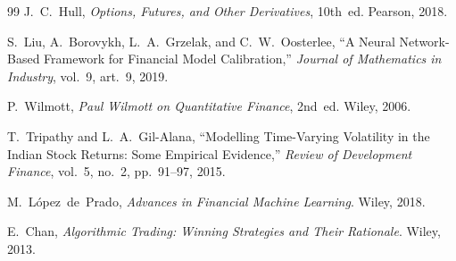 \documentclass[12pt,a4paper]{article}
\begin{document}
\begin{thebibliography}{99}
J.~C.~Hull, \textit{Options, Futures, and Other Derivatives}, 10th~ed. Pearson, 2018.

S.~Liu, A.~Borovykh, L.~A.~Grzelak, and C.~W.~Oosterlee, ``A Neural Network-Based Framework for Financial Model Calibration,'' \textit{Journal of Mathematics in Industry}, vol.~9, art.~9, 2019.

P.~Wilmott, \textit{Paul Wilmott on Quantitative Finance}, 2nd~ed. Wiley, 2006.

T.~Tripathy and L.~A.~Gil-Alana, ``Modelling Time-Varying Volatility in the Indian Stock Returns: Some Empirical Evidence,'' \textit{Review of Development Finance}, vol.~5, no.~2, pp.~91--97, 2015.

M.~L\'{o}pez~de~Prado, \textit{Advances in Financial Machine Learning}. Wiley, 2018.

E.~Chan, \textit{Algorithmic Trading: Winning Strategies and Their Rationale}. Wiley, 2013.

\end{thebibliography}
\end{document}
